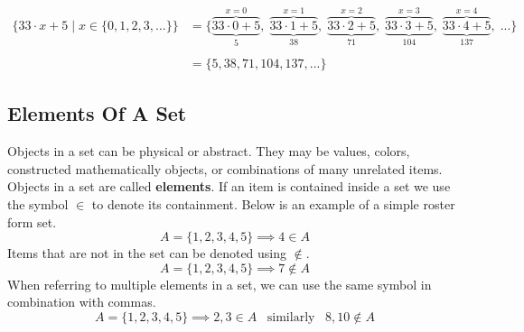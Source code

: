 \begin{itemize}
\begin{itemize}
\begin{itemize}
                    \begin{align*}
                    \{33 \cdot x + 5 \mid x \in \{0,1,2,3,...\}\} &=\{ \overbrace{\underbrace{33\cdot 0 + 5}}^{x=0}_{5},\; \overbrace{\underbrace{33\cdot 1 + 5}}^{x=1}_{38},\;\overbrace{\underbrace{33\cdot 2 + 5}}^{x=2}_{71},\;\overbrace{\underbrace{33\cdot 3 + 5}}^{x=3}_{104},\; \overbrace{\underbrace{33\cdot 4 + 5}}^{x=4}_{137},\;...\}\\\\
                    &= \{5,38,71,104,137,...\}
                    \end{align*}
                \end{itemize}
        \end{itemize}  
\end{itemize}

\subsection*{Elements Of  A Set}
Objects in a set can be physical or abstract.  They may be values, colors, constructed mathematically objects, or combinations of many unrelated items.  Objects in a set are called \textbf{elements}.   If an item is contained inside a set we use the symbol $\in$ to denote its containment.  Below is an example of a simple roster form set.
$$A = \{1,2,3,4,5\} \implies 4 \in A$$
Items that are not in the set can be denoted using $\notin$.
$$A = \{1,2,3,4,5\} \implies 7 \notin A$$
When referring to multiple elements in a set, we can use the same symbol in combination with commas.
$$A = \{1,2,3,4,5\} \implies 2,3 \in A \;\;\; \text{similarly} \;\;\; 8,10 \notin A$$

